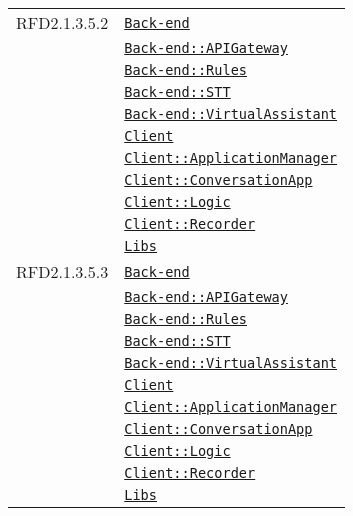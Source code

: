 \begin{longtable}{|>{\centering}m{3cm}|m{10cm}<{\centering}|}
RFD2.1.3.5.2 & \hyperref[Back-end]{\texttt{Back-end}}\\
& \hyperref[Back-end::APIGateway]{\texttt{Back-end::APIGateway}}\\
& \hyperref[Back-end::Rules]{\texttt{Back-end::Rules}}\\
& \hyperref[Back-end::STT]{\texttt{Back-end::STT}}\\
& \hyperref[Back-end::VirtualAssistant]{\texttt{Back-end::VirtualAssistant}}\\
& \hyperref[Client]{\texttt{Client}}\\
& \hyperref[Client::ApplicationManager]{\texttt{Client::ApplicationManager}}\\
& \hyperref[Client::ConversationApp]{\texttt{Client::ConversationApp}}\\
& \hyperref[Client::Logic]{\texttt{Client::Logic}}\\
& \hyperref[Client::Recorder]{\texttt{Client::Recorder}}\\
& \hyperref[Libs]{\texttt{Libs}}\\ \hline

RFD2.1.3.5.3 & \hyperref[Back-end]{\texttt{Back-end}}\\
& \hyperref[Back-end::APIGateway]{\texttt{Back-end::APIGateway}}\\
& \hyperref[Back-end::Rules]{\texttt{Back-end::Rules}}\\
& \hyperref[Back-end::STT]{\texttt{Back-end::STT}}\\
& \hyperref[Back-end::VirtualAssistant]{\texttt{Back-end::VirtualAssistant}}\\
& \hyperref[Client]{\texttt{Client}}\\
& \hyperref[Client::ApplicationManager]{\texttt{Client::ApplicationManager}}\\
& \hyperref[Client::ConversationApp]{\texttt{Client::ConversationApp}}\\
& \hyperref[Client::Logic]{\texttt{Client::Logic}}\\
& \hyperref[Client::Recorder]{\texttt{Client::Recorder}}\\
& \hyperref[Libs]{\texttt{Libs}}\\ \hline


\end{longtable}
